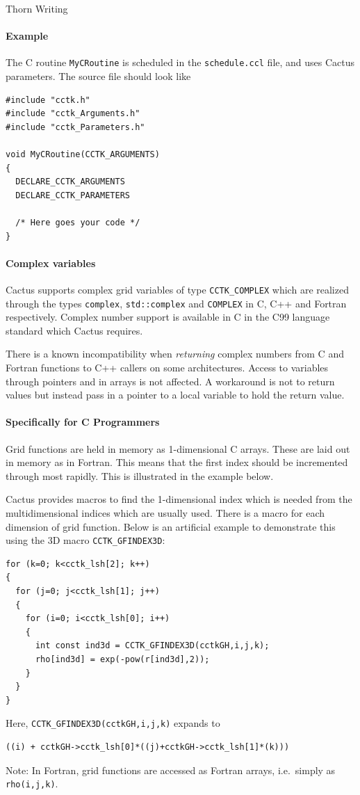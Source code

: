 \begin{cactuspart}{Thorn Writing}
\paragraph{Example}

The C routine \verb|MyCRoutine| is scheduled in the \texttt{schedule.ccl} file,
and uses Cactus parameters. The source file should look like
\begin{verbatim}
#include "cctk.h"
#include "cctk_Arguments.h"
#include "cctk_Parameters.h"

void MyCRoutine(CCTK_ARGUMENTS)
{
  DECLARE_CCTK_ARGUMENTS
  DECLARE_CCTK_PARAMETERS

  /* Here goes your code */
}
\end{verbatim}

\paragraph{Complex variables}

Cactus supports complex grid variables of type \texttt{CCTK\_COMPLEX} which
are realized through the types \texttt{complex}, \texttt{std::complex} and
\texttt{COMPLEX} in C, C++ and Fortran respectively. Complex number support is
available in C in the C99 language standard which Cactus requires.

There is a known incompatibility when \emph{returning} complex numbers from C
and Fortran functions to C++ callers on some architectures. Access to
variables through pointers and in arrays is not affected. A workaround is not
to return values but instead pass in a pointer to a local variable to hold the
return value.

\paragraph{Specifically for C Programmers}

Grid functions are held in memory as 1-dimensional C arrays. These are laid
out in memory as in Fortran. This means that the first index should
be incremented through most rapidly.  This is illustrated in the example
below.

Cactus provides
macros to find the 1-dimensional index which is needed from the multidimensional
indices which are usually used. There is a macro for each dimension of
grid function.  Below is an artificial example to demonstrate this
using the 3D macro \texttt{CCTK\_GFINDEX3D}:
\begin{verbatim}
for (k=0; k<cctk_lsh[2]; k++)
{
  for (j=0; j<cctk_lsh[1]; j++)
  {
    for (i=0; i<cctk_lsh[0]; i++)
    {
      int const ind3d = CCTK_GFINDEX3D(cctkGH,i,j,k);
      rho[ind3d] = exp(-pow(r[ind3d],2));
    }
  }
}
\end{verbatim}
%
Here, \verb|CCTK_GFINDEX3D(cctkGH,i,j,k)| expands to
\begin{verbatim}
((i) + cctkGH->cctk_lsh[0]*((j)+cctkGH->cctk_lsh[1]*(k)))
\end{verbatim}
%
Note: In Fortran, grid functions are accessed as Fortran arrays,
i.e.\ simply as \verb|rho(i,j,k)|.


\end{cactuspart}
